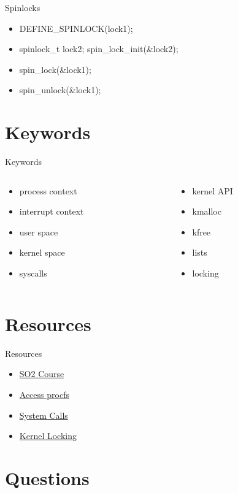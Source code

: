 \documentclass{workshop}
\begin{document}
\begin{frame}{Spinlocks}
  \begin{itemize}
    \item DEFINE_SPINLOCK(lock1);
    \item spinlock_t lock2; spin_lock_init(\&lock2);
    \item spin_lock(\&lock1);
    \item spin_unlock(\&lock1);
  \end{itemize}
\end{frame}








\section{Keywords}
\begin{frame}{Keywords}
  \begin{columns}
    \begin{column}[l]{0.5\textwidth}
      \begin{itemize}
        \item process context
        \item interrupt context
        \item user space
        \item kernel space
        \item syscalls
      \end{itemize}
    \end{column}
    \begin{column}[l]{0.5\textwidth}
      \begin{itemize}
        \item kernel API
        \item kmalloc
        \item kfree
        \item lists
        \item locking
      \end{itemize}
    \end{column}
  \end{columns}
\end{frame}

\section{Resources}
\begin{frame}{Resources}
  \begin{itemize}
  \item \href{http://elf.cs.pub.ro/so2/wiki/}{SO2 Course}
  \item \href{http://www.ibm.com/developerworks/linux/library/l-proc/index.html}{Access procfs}
  \item \href{http://articles.manugarg.com/systemcallinlinux2_6.html}{System Calls}
  \item \href{http://www.kernel.org/pub/linux/kernel/people/rusty/kernel-locking/c214.html}{Kernel Locking}
  \end{itemize}
\end{frame}

\section{Questions}
\end{document}

